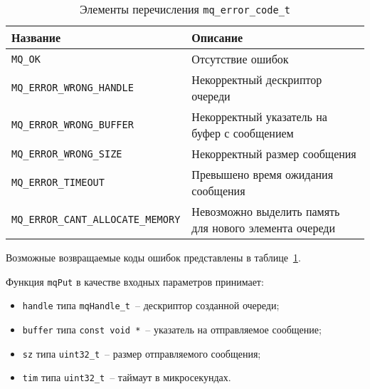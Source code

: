 \begin{table}[ht]
    \caption{Элементы перечисления \lstinline{mq_error_code_t}}
    \label{table:func:mqErrorCode}
    \begin{tabular}{| >{\raggedright}m{}
                    | >{\raggedright\arraybackslash}m{}|}
        \hline
        \centering Название & \centering\arraybackslash Описание \\

        \hline
        \lstinline[]$MQ_OK$ &
        Отсутствие ошибок
        \\

        \hline
        \lstinline[]$MQ_ERROR_WRONG_HANDLE$ &
        Некорректный дескриптор очереди
        \\

        \hline
        \lstinline[]$MQ_ERROR_WRONG_BUFFER$ &
        Некорректный указатель на буфер с сообщением
        \\

        \hline
        \lstinline[]$MQ_ERROR_WRONG_SIZE$ &
        Некорректный размер сообщения
        \\

        \hline
        \lstinline[]$MQ_ERROR_TIMEOUT$ &
        Превышено время ожидания сообщения
        \\

        \hline
        \lstinline[]$MQ_ERROR_CANT_ALLOCATE_MEMORY$ &
        Невозможно выделить память для нового элемента очереди
        \\

        \hline
    \end{tabular}
\end{table}

Возможные возвращаемые коды ошибок представлены в таблице~\ref{table:func:mqErrorCode}.

Функция \lstinline{mqPut} в качестве входных параметров принимает:

\begin{itemize}
    \item \lstinline{handle} типа \lstinline{mqHandle_t}~-- дескриптор созданной очереди;
    \item \lstinline{buffer} типа \lstinline{const void *}~-- указатель на отправляемое сообщение;
    \item \lstinline{sz} типа \lstinline{uint32_t}~-- размер отправляемого сообщения;
    \item \lstinline{tim} типа \lstinline{uint32_t}~-- таймаут в микросекундах.
\end{itemize}

